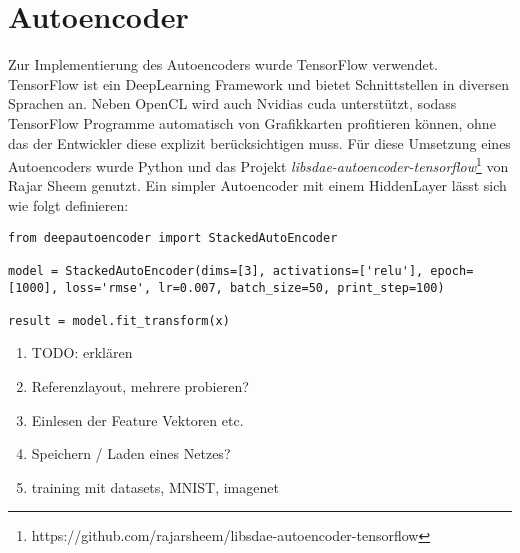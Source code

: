 \section{Autoencoder}

Zur Implementierung des Autoencoders wurde TensorFlow verwendet. TensorFlow ist ein DeepLearning Framework und bietet Schnittstellen in diversen Sprachen an. Neben OpenCL wird auch Nvidias cuda unterstützt, sodass TensorFlow Programme automatisch von Grafikkarten profitieren können, ohne das der Entwickler diese explizit berücksichtigen muss. Für diese Umsetzung eines Autoencoders wurde Python und das Projekt \textit{libsdae-autoencoder-tensorflow}\footnote{https://github.com/rajarsheem/libsdae-autoencoder-tensorflow} von Rajar Sheem genutzt. Ein simpler Autoencoder mit einem HiddenLayer lässt sich wie folgt definieren:

\lstset{language=Python}
\begin{lstlisting}
from deepautoencoder import StackedAutoEncoder

model = StackedAutoEncoder(dims=[3], activations=['relu'], epoch=[1000], loss='rmse', lr=0.007, batch_size=50, print_step=100)
                       
result = model.fit_transform(x)
\end{lstlisting}

\begin{enumerate}
	\item TODO: erklären
	\item Referenzlayout, mehrere probieren?
	\item Einlesen der Feature Vektoren etc.
	\item Speichern / Laden eines Netzes?
	\item training mit datasets, MNIST, imagenet
\end{enumerate}